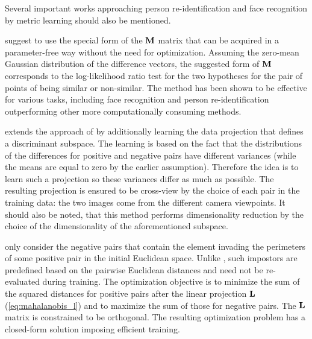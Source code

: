 

Several important works approaching person re-identification and face recognition by metric learning should also be mentioned.

\citep{koestinger2012large} suggest to use the special form of the $\bold{M}$ matrix that can be acquired in a parameter-free way without the need for optimization. Assuming the zero-mean Gaussian distribution of the difference vectors, the suggested form of $\bold{M}$ corresponds to the log-likelihood ratio test for the two hypotheses for the pair of points of being similar or non-similar. The method has been shown to be effective for various tasks, including face recognition and person re-identification \citep{koestinger2012large,roth2014mahalanobis} outperforming other more computationally consuming methods. %

\citep{liao2015person} extends the approach of \citep{koestinger2012large} by additionally learning the data projection that defines a discriminant subspace. The learning is based on the fact that the distributions of the differences for positive and negative pairs have different variances (while the means are equal to zero by the earlier assumption). Therefore the idea is to learn such a projection so these variances differ as much as possible. The resulting projection is ensured to be cross-view by the choice of each pair in the training data: the two images come from the different camera viewpoints. It should also be noted, that this method performs dimensionality reduction by the choice of the dimensionality of the aforementioned subspace.


\citep{hirzer2012person} only consider the negative pairs that contain the element invading the perimeters of some positive pair in the initial Euclidean space. Unlike \citep{NIPS2005_2795}, such impostors are predefined based on the pairwise Euclidean distances and need not be re-evaluated during training. The optimization objective is to minimize the sum of the squared distances for positive pairs after the linear projection $\bold{L}$ (\ref{eq:mahalanobis_l}) and to maximize the sum of those for negative pairs. The $\bold{L}$ matrix is constrained to be orthogonal. The resulting optimization problem has a closed-form solution imposing efficient training. %

